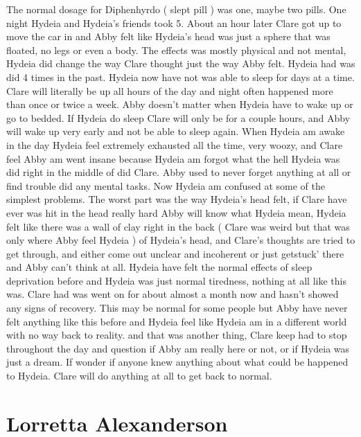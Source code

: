 \documentclass[12pt]{book}
\begin{document}
The normal dosage for Diphenhyrdo ( slept pill ) was one, maybe two pills. One night Hydeia and Hydeia's friends took 5. About an hour later Clare got up to move the car in and Abby felt like Hydeia's head was just a sphere that was floated, no legs or even a body. The effects was mostly physical and not mental, Hydeia did change the way Clare thought just the way Abby felt. Hydeia had was did 4 times in the past. Hydeia now have not was able to sleep for days at a time. Clare will literally be up all hours of the day and night often happened more than once or twice a week. Abby doesn't matter when Hydeia have to wake up or go to bedded. If Hydeia do sleep Clare will only be for a couple hours, and Abby will wake up very early and not be able to sleep again. When Hydeia am awake in the day Hydeia feel extremely exhausted all the time, very woozy, and Clare feel Abby am went insane because Hydeia am forgot what the hell Hydeia was did right in the middle of did Clare. Abby used to never forget anything at all or find trouble did any mental tasks. Now Hydeia am confused at some of the simplest problems. The worst part was the way Hydeia's head felt, if Clare have ever was hit in the head really hard Abby will know what Hydeia mean, Hydeia felt like there was a wall of clay right in the back ( Clare was weird but that was only where Abby feel Hydeia ) of Hydeia's head, and Clare's thoughts are tried to get through, and either come out unclear and incoherent or just getstuck' there and Abby can't think at all. Hydeia have felt the normal effects of sleep deprivation before and Hydeia was just normal tiredness, nothing at all like this was. Clare had was went on for about almost a month now and hasn't showed any signs of recovery. This may be normal for some people but Abby have never felt anything like this before and Hydeia feel like Hydeia am in a different world with no way back to reality. and that was another thing, Clare keep had to stop throughout the day and question if Abby am really here or not, or if Hydeia was just a dream. If wonder if anyone knew anything about what could be happened to Hydeia. Clare will do anything at all to get back to normal.



\chapter{Lorretta Alexanderson}
\end{document}
